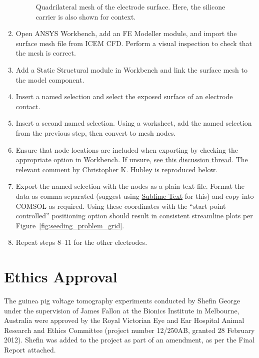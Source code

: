 \begin{appendices}
\begin{enumerate}
\begin{figure}
		\caption[Quadrilateral mesh of the electrode surface]{Quadrilateral mesh of
		the electrode surface. Here, the silicone carrier is also shown for context.}
		\label{fig:electrode_quad_mesh}
	\end{figure}
    
    \item Open ANSYS Workbench, add an FE Modeller module, and import the
    surface mesh file from ICEM CFD. Perform a visual inspection to check that
    the mesh is correct.
    \item Add a Static Structural module in Workbench and link the surface mesh
    to the model component.
    \item Insert a named selection and select the exposed surface of an
    electrode contact.
    \item Insert a second named selection. Using a worksheet, add the named
    selection from the previous step, then convert to mesh nodes.
    \item Ensure that node locations are included when exporting by checking the
    appropriate option in Workbench. If unsure,
    \href{http://www.eng-tips.com/viewthread.cfm?qid=310295}{see this discussion
    thread}. The relevant comment by Christopher K. Hubley is reproduced
    below.\bigskip
	    \setstretchcode
		
		\setstretchnormal
	\item Export the named selection with the nodes as a plain text file. Format
	the data as comma separated (suggest using
	\href{http://www.sublimetext.com/}{Sublime Text} for this) and copy into COMSOL
	as required. Using these coordinates with the ``start point controlled''
	positioning option should result in consistent streamline plots per
	Figure~\ref{fig:seeding_problem_grid}.
	\item Repeat steps 8--11 for the other electrodes.
\end{enumerate}


\chapter{Ethics Approval}
\label{appendix:ethics}

The guinea pig voltage tomography experiments conducted by Shefin George under
the supervision of James Fallon at the Bionics Institute in Melbourne, Australia
were approved by the Royal Victorian Eye and Ear Hospital Animal Research and
Ethics Committee (project number 12/250AB, granted 28 February 2012). Shefin was
added to the project as part of an amendment, as per the Final Report attached.


\end{appendices}
